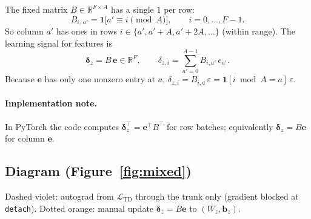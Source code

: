 \documentclass[11pt]{article}
\begin{document}
The fixed matrix $B \in \mathbb{R}^{F \times A}$ has a single $1$ per row:
\begin{equation}
B_{i,\,a'} = \mathbf{1}\bigl[a' \equiv i \pmod{A}\bigr],
\qquad i=0,\ldots,F-1.
\end{equation}
So column $a'$ has ones in rows $i \in \{a', a'+A, a'+2A, \ldots\}$ (within range). The learning signal for features is
\begin{equation}
\label{eq:delta-z-mixed}
\boldsymbol{\delta}_z = B\,\mathbf{e} \in \mathbb{R}^{F},
\qquad
\delta_{z,i} = \sum_{a'=0}^{A-1} B_{i,a'}\, e_{a'}.
\end{equation}
Because $\mathbf{e}$ has only one nonzero entry at $a$, $\delta_{z,i} = B_{i,a}\,\varepsilon = \mathbf{1}[i \bmod A = a]\,\varepsilon$.

\paragraph{Implementation note.} In PyTorch the code computes $\boldsymbol{\delta}_z^\top = \mathbf{e}^\top B^\top$ for row batches; equivalently $\boldsymbol{\delta}_z = B\mathbf{e}$ for column $\mathbf{e}$.

\subsection{Diagram (Figure~\ref{fig:mixed})}
\textcolor{violet!85!black}{Dashed violet:} autograd from $\mathcal{L}_{\mathrm{TD}}$ through the trunk only (gradient blocked at \texttt{detach}). \textcolor{orange!90!black}{Dotted orange:} manual update $\boldsymbol{\delta}_z = B\mathbf{e}$ to $(W_z,\mathbf{b}_z)$.
\end{document}

